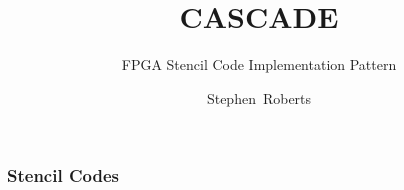 \documentclass{beamer}
\title{CASCADE}
\subtitle{FPGA Stencil Code Implementation Pattern}
\author{Stephen~Roberts}
\institute{The University Of Warwick}
\begin{document}
  \frame{\titlepage}
  \begin{frame}
    \frametitle{Stencil Codes}
    \begin{figure}
      \centering
      
    \end{figure}
  \end{frame}
\end{document}
